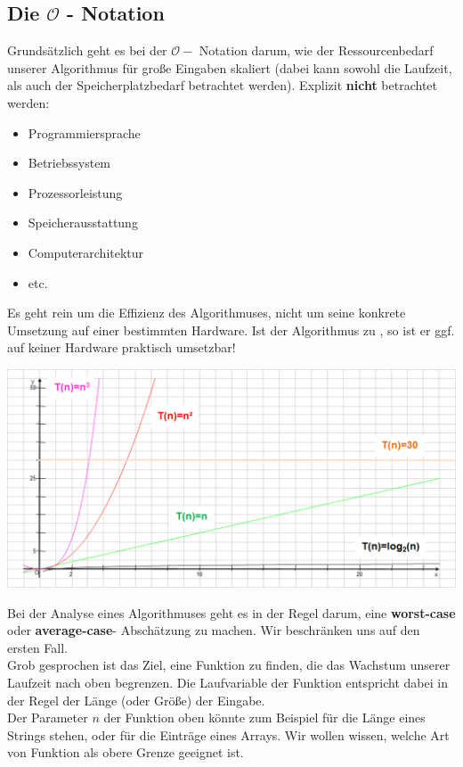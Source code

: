 \documentclass{article}
\begin{document}
\subsection{Die $\mathcal{O}$ - Notation}
Grundsätzlich geht es bei der $\mathcal{O}-$ Notation darum, wie der Ressourcenbedarf unserer Algorithmus für große Eingaben skaliert (dabei kann sowohl die Laufzeit, als auch der Speicherplatzbedarf betrachtet werden). Explizit \textbf{nicht} betrachtet werden:
\begin{itemize}
    \item Programmiersprache
    \item Betriebssystem
    \item Prozessorleistung
    \item Speicherausstattung
    \item Computerarchitektur
    \item etc. 
\end{itemize}
Es geht rein um die Effizienz des Algorithmuses, nicht um seine konkrete Umsetzung auf einer bestimmten Hardware. Ist der Algorithmus zu , so ist er ggf. auf keiner Hardware praktisch umsetzbar!
\begin{center}
    \includegraphics[scale=0.55]{../media/o.png}
\end{center}
Bei der Analyse eines Algorithmuses geht es in der Regel darum, eine \textbf{worst-case} oder \textbf{average-case}- Abschätzung zu machen. Wir beschränken uns auf den ersten Fall. \\
Grob gesprochen ist das Ziel, eine Funktion zu finden, die das Wachstum unserer Laufzeit nach oben begrenzen. Die Laufvariable der Funktion entspricht dabei in der Regel der Länge (oder Größe) der Eingabe. \\
Der Parameter $n$ der Funktion oben könnte zum Beispiel für die Länge eines Strings stehen, oder für die Einträge eines Arrays. Wir wollen wissen, welche Art von Funktion als obere Grenze geeignet ist. \\
\end{document}
